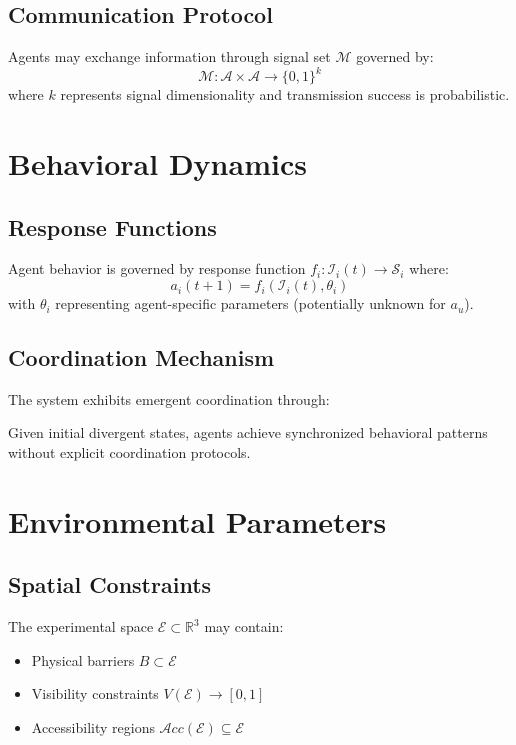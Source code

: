 \documentclass{article}
\begin{document}
\subsection{Communication Protocol}
Agents may exchange information through signal set $\mathcal{M}$ governed by:
$$\mathcal{M}: \mathcal{A} \times \mathcal{A} \rightarrow \{0, 1\}^k$$
where $k$ represents signal dimensionality and transmission success is probabilistic.

\section{Behavioral Dynamics}

\subsection{Response Functions}
Agent behavior is governed by response function $f_i: \mathcal{I}_i(t) \rightarrow \mathcal{S}_i$ where:
$$a_i(t+1) = f_i(\mathcal{I}_i(t), \theta_i)$$
with $\theta_i$ representing agent-specific parameters (potentially unknown for $a_u$).

\subsection{Coordination Mechanism}
The system exhibits emergent coordination through:
\begin{theorem}
Given initial divergent states, agents achieve synchronized behavioral patterns without explicit coordination protocols.
\end{theorem}

\section{Environmental Parameters}

\subsection{Spatial Constraints}
The experimental space $\mathcal{E} \subset \mathbb{R}^3$ may contain:
\begin{itemize}
    \item Physical barriers $B \subset \mathcal{E}$
    \item Visibility constraints $V(\mathcal{E}) \rightarrow [0,1]$
    \item Accessibility regions $\mathcal{A}cc(\mathcal{E}) \subseteq \mathcal{E}$
\end{itemize}
\end{document}
